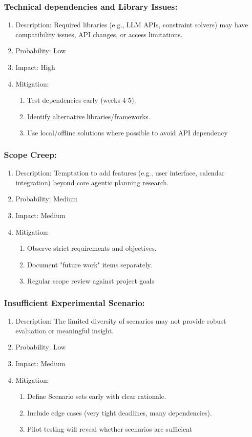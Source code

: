 \documentclass[12pt]{article}
\begin{document}
\subsubsection{Technical dependencies and Library Issues:}
\begin{enumerate}
    \item Description: Required libraries (e.g., LLM APIs, constraint solvers) may have compatibility issues, API changes, or access limitations.
    \item Probability: Low
    \item Impact: High
    \item Mitigation: 
  \begin{enumerate}
      \item Test dependencies early (weeks 4-5).
    \item Identify alternative libraries/frameworks.
    \item Use local/offline solutions where possible to avoid API dependency
    \end{enumerate}
\end{enumerate}
\subsubsection{Scope Creep:}
\begin{enumerate}
    \item Description: Temptation to add features (e.g., user interface, calendar integration) beyond core agentic planning research.
    \item Probability: Medium
    \item Impact: Medium
    \item Mitigation: 
  \begin{enumerate}
      \item Observe strict requirements and objectives.
    \item Document "future work" items separately.
    \item Regular scope review against project goals
    \end{enumerate}
\end{enumerate}
\subsubsection{Insufficient Experimental Scenario:}
\begin{enumerate}
    \item Description: The limited diversity of scenarios may not provide robust evaluation or meaningful insight.
    \item Probability: Low
    \item Impact: Medium
    \item Mitigation: 
  \begin{enumerate}
      \item Define Scenario sets early with clear rationale.
    \item Include edge cases (very tight deadlines, many dependencies).
    \item Pilot testing will reveal whether scenarios are sufficient
    \end{enumerate}
\end{enumerate}
\end{document}
